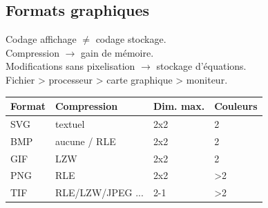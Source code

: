 \documentclass[14pt]{beamer}
\begin{document}
\subsection{Formats graphiques}
\begin{frame}{\subsecname}
    Codage affichage $\neq$ codage stockage.\\
    Compression $\rightarrow$ gain de mémoire.\\
    Modifications sans pixelisation $\rightarrow$ stockage d'équations.\\
    Fichier > processeur > carte graphique > moniteur.
    \begin{tabular}{|l|l|l|l|}
    \hline
    Format & Compression & Dim. max. & Couleurs \\
    \hline
    SVG & textuel & 2\up{16}x2\up{16} & 2\up{24} \\
    \hline
    BMP & aucune / RLE & 2\up{16}x2\up{16} & 2\up{24} \\
    \hline
    GIF & LZW & 2\up{16}x2\up{16} & 2\up{8} \\
    \hline
    PNG & RLE & 2\up{16}x2\up{16} & >2\up{24} \\
    \hline
    TIF & \small{RLE/LZW/JPEG ...} & 2\up{32}-1 & >2\up{14} \\
    \hline
    \end{tabular}
\end{frame}



\end{document}
